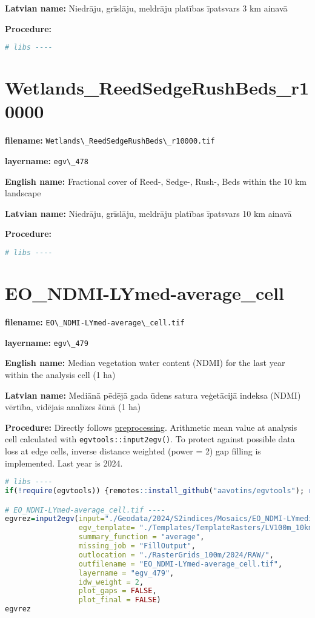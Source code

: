 \documentclass[
]{book}
\newcommand{\passthrough}[1]{#1}
\begin{document}
\textbf{Latvian name:} Niedrāju, grīslāju, meldrāju platības īpatsvars 3 km ainavā

\textbf{Procedure:}

\begin{lstlisting}[language=R]
# libs ----
\end{lstlisting}

\section{Wetlands\_ReedSedgeRushBeds\_r10000}\label{ch06.478}

\textbf{filename:} \passthrough{\lstinline!Wetlands\_ReedSedgeRushBeds\_r10000.tif!}

\textbf{layername:} \passthrough{\lstinline!egv\_478!}

\textbf{English name:} Fractional cover of Reed-, Sedge-, Rush-, Beds within the 10 km landscape

\textbf{Latvian name:} Niedrāju, grīslāju, meldrāju platības īpatsvars 10 km ainavā

\textbf{Procedure:}

\begin{lstlisting}[language=R]
# libs ----
\end{lstlisting}

\section{EO\_NDMI-LYmed-average\_cell}\label{ch06.479}

\textbf{filename:} \passthrough{\lstinline!EO\_NDMI-LYmed-average\_cell.tif!}

\textbf{layername:} \passthrough{\lstinline!egv\_479!}

\textbf{English name:} Median vegetation water content (NDMI) for the last year within the analysis cell (1 ha)

\textbf{Latvian name:} Mediānā pēdējā gada ūdens satura veģetācijā indeksa (NDMI) vērtība, vidējais analīzes šūnā (1 ha)

\textbf{Procedure:} Directly follows \hyperref[Ch04.13]{preprocessing}. Arithmetic mean value at analysis cell
calculated with \passthrough{\lstinline!egvtools::input2egv()!}. To protect against possible data loss at edge cells,
inverse distance weighted (power = 2) gap filling is implemented. Last year is 2024.

\begin{lstlisting}[language=R]
# libs ----
if(!require(egvtools)) {remotes::install_github("aavotins/egvtools"); require(egvtools)}

# EO_NDMI-LYmed-average_cell.tif ----
egvrez=input2egv(input="./Geodata/2024/S2indices/Mosaics/EO_NDMI-LYmedian.tif",
                 egv_template= "./Templates/TemplateRasters/LV100m_10km.tif",
                 summary_function = "average",
                 missing_job = "FillOutput",
                 outlocation = "./RasterGrids_100m/2024/RAW/",
                 outfilename = "EO_NDMI-LYmed-average_cell.tif",
                 layername = "egv_479",
                 idw_weight = 2,
                 plot_gaps = FALSE,
                 plot_final = FALSE)
egvrez
\end{lstlisting}
\end{document}
